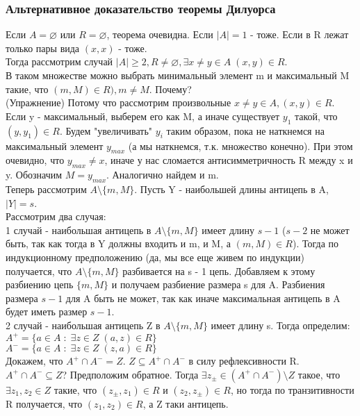 \subsubsection{Альтернативное доказательство теоремы Дилуорса}
Если $A = \varnothing$ или $R = \varnothing$, теорема очевидна. Если $|A| = 1$ - тоже. Если в R лежат только пары вида $(x, x)$ - тоже.\\
Тогда рассмотрим случай $|A| \geq 2, R \not= \varnothing, \exists x \not= y \in A \; (x, y) \in R$.\\
В таком множестве можно выбрать минимальный элемент m и максимальный M такие, что $(m, M) \in R), m \not= M$. Почему?\\
(Упражнение) Потому что рассмотрим произвольные $x \not= y \in A, (x, y) \in R$. Если y - максимальный, выберем его как M, а иначе существует $y_1$ такой, что $(y, y_1) \in R$. Будем "увеличивать" $y_i$ таким образом, пока не наткнемся на максимальный элемент $y_{max}$ (а мы наткнемся, т.к. множество конечно). При этом очевидно, что $y_{max} \not= x$, иначе у нас сломается антисимметричность R между x и y. Обозначим $M = y_{max}$. Аналогично найдем и m. \\
Теперь рассмотрим $A \setminus \{m, M\}$. Пусть Y - наибольшей длины антицепь в A, $|Y| = s$.\\
Рассмотрим два случая: \\
1 случай - наибольшая антицепь в $A \setminus \{m, M\}$ имеет длину $s - 1$ ($s - 2$ не может быть, так как тогда в Y должны входить и m, и M, а $(m, M) \in R$). Тогда по индукционному предположению (да, мы все еще живем по индукции) получается, что $A \setminus \{m, M\}$ разбивается на s - 1 цепь. Добавляем к этому разбиению цепь $\{m, M\}$ и получаем разбиение размера s для A. Разбиения размера $s - 1$ для A быть не может, так как иначе максимальная антицепь в A будет иметь размер $s - 1$.\\
2 случай - наибольшая антицепь Z в $A \setminus \{m, M\}$ имеет длину s. Тогда определим:\\
$A^+ = \{a \in A \; : \; \exists z \in Z \; (a, z) \in R\}$\\
$A^- = \{a \in A \; : \; \exists z \in Z \; (z, a) \in R\}$\\
Докажем, что $A^+ \cap A^- = Z$. $Z \subseteq A^+ \cap A^-$ в силу рефлексивности R. $A^+ \cap A^- \subseteq Z$? Предположим обратное. Тогда $\exists z_{\pm} \in (A^+ \cap A^-) \setminus Z$ такое, что $\exists z_1, z_2 \in Z$ такие, что $(z_{\pm}, z_1) \in R$ и $(z_2, z_{\pm}) \in R$, но тогда по транзитивности R получается, что $(z_1, z_2) \in R$, а Z таки антицепь.\\
